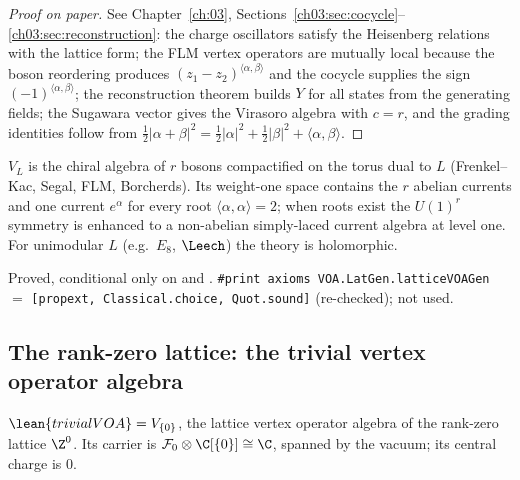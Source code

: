 \begin{proof}[Proof on paper]
See Chapter~\ref{ch:03}, Sections~\ref{ch03:sec:cocycle}--\ref{ch03:sec:reconstruction}: the charge oscillators
satisfy the Heisenberg relations with the lattice form; the FLM vertex operators are mutually local because the
boson reordering produces $(z_1-z_2)^{\langle\alpha,\beta\rangle}$ and the cocycle supplies the sign
$(-1)^{\langle\alpha,\beta\rangle}$; the reconstruction theorem builds $Y$ for all states from the generating fields;
the Sugawara vector gives the Virasoro algebra with $c=r$, and the grading identities follow from
$\frac12|\alpha+\beta|^2=\frac12|\alpha|^2+\frac12|\beta|^2+\langle\alpha,\beta\rangle$.
\end{proof}

\begin{physics}
$V_L$ is the chiral algebra of $r$ bosons compactified on the torus dual to $L$ (Frenkel--Kac, Segal, FLM,
Borcherds). Its weight-one space contains the $r$ abelian currents and one current $e^\alpha$ for every root
$\langle\alpha,\alpha\rangle=2$; when roots exist the $U(1)^r$ symmetry is enhanced to a non-abelian simply-laced current
algebra at level one. For unimodular $L$ (e.g.\ $E_8$, $\Leech$) the theory is holomorphic.
\end{physics}

\begin{status}
Proved, conditional only on  and . \texttt{\#print axioms VOA.LatGen.latticeVOAGen} $=$
\texttt{[propext, Classical.choice, Quot.sound]} (re-checked);  not used.
\end{status}

\subsection{The rank-zero lattice: the trivial vertex operator algebra}\label{l05:sec:trivial}

\begin{definition}\label{l05:def:trivial}
$\lean{trivialVOA}=V_{\{0\}}$, the lattice vertex operator algebra of the rank-zero lattice $\Z^0$. Its carrier is
$\lfiveF_0\otimes\C[\{0\}]\cong\C$, spanned by the vacuum; its central charge is $0$.
\end{definition}


